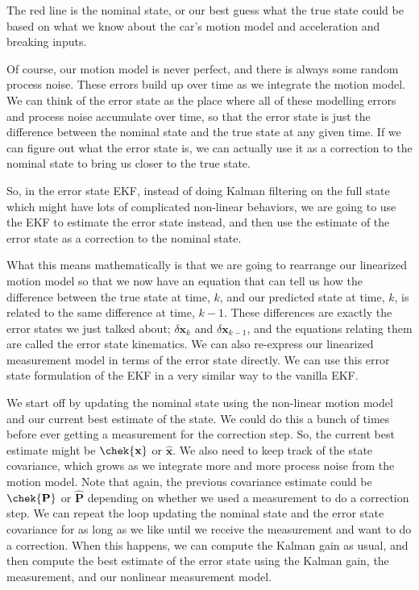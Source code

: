 The red line is the nominal state, or our best guess what the true state could
be based on what we know about the car's motion model and acceleration and breaking inputs. 

Of course, our motion model is never perfect, and there is always some random process noise. These errors build up over time as we integrate
the motion model. We can think of the error state as the place where all of these modelling errors and process noise
accumulate over time, so that the error state is just the difference between the nominal state and the true state at any given time. 
If we can figure out what the error state is, we can actually use it as a correction to the nominal state to bring us closer to
the true state. 

So, in the error state EKF, instead of doing Kalman filtering on the full state
which might have lots of complicated non-linear behaviors, we are going to
use the EKF to estimate the error
state instead, and then use the estimate of the error state as a correction to
the nominal state. 

What this means mathematically is that we are going to rearrange our
linearized motion model so that we now have an equation
that can tell us how the difference between the true state at time, $k$, and our predicted
state at time, $k$, is related to
the same difference at time, $k-1$. These differences
are exactly the error states we just talked about; $\delta \mathbf{x}_k$  and
$\delta \mathbf{x}_{k-1}$, and the equations relating them are called the error
state kinematics. We can also re-express our linearized
measurement model in terms of the error state directly. We can use this error state formulation of the EKF in
a very similar way to the vanilla EKF. 

We start off by updating the nominal state using the non-linear motion model and our current best
estimate of the state. We could do this a bunch of times before ever getting a measurement for the correction step. So, the current
best estimate might be $\chek{\mathbf{x}}$ or $\hat{\mathbf{x}}$. We also need to keep track of the state covariance, which grows as
we integrate more and more process noise from the motion model. Note that again, the previous
covariance estimate could be $\chek{\mathbf{P}}$  or $\hat{\mathbf{P}}$ depending
on whether we used a measurement to do a correction step. We can repeat the loop updating the
nominal state and the error state covariance for as long as we like until we receive
the measurement and want to do a correction. When this happens, we can compute the Kalman gain as usual, and then compute
the best estimate of the error state using
the Kalman gain, the measurement, and our nonlinear
measurement model. 

